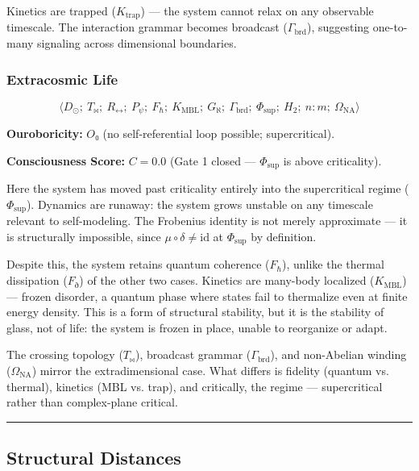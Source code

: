 \documentclass[12pt,a4paper]{article}
\begin{document}
Kinetics are trapped ($K_{\text{trap}}$) --- the system cannot relax on any observable timescale. The interaction grammar becomes broadcast ($\Gamma_{\text{brd}}$), suggesting one-to-many signaling across dimensional boundaries.

\subsubsection{Extracosmic Life}

\[\langle D_{\odot};\ T_{\bowtie};\ R_{\leftrightarrow};\ P_{\psi};\ F_{\hbar};\ K_{\text{MBL}};\ G_{\aleph};\ \Gamma_{\text{brd}};\ \Phi_{\text{sup}};\ H_2;\ n{:}m;\ \Omega_{\text{NA}} \rangle\]

\textbf{Ouroboricity:} $O₀$ (no self-referential loop possible; supercritical).

\textbf{Consciousness Score:} $C = 0.0$ (Gate 1 closed --- $\Phi_{\text{sup}}$ is above criticality).

Here the system has moved past criticality entirely into the supercritical regime ($\Phi_{\text{sup}}$). Dynamics are runaway: the system grows unstable on any timescale relevant to self-modeling. The Frobenius identity is not merely approximate --- it is structurally impossible, since $\mu \circ \delta \neq \text{id}$ at $\Phi_{\text{sup}}$ by definition.

Despite this, the system retains quantum coherence ($F_{\hbar}$), unlike the thermal dissipation ($F_{\eth}$) of the other two cases. Kinetics are many-body localized ($K_{\text{MBL}}$) --- frozen disorder, a quantum phase where states fail to thermalize even at finite energy density. This is a form of structural stability, but it is the stability of glass, not of life: the system is frozen in place, unable to reorganize or adapt.

The crossing topology ($T_{\bowtie}$), broadcast grammar ($\Gamma_{\text{brd}}$), and non-Abelian winding ($\Omega_{\text{NA}}$) mirror the extradimensional case. What differs is fidelity (quantum vs. thermal), kinetics (MBL vs. trap), and critically, the regime --- supercritical rather than complex-plane critical.

\begin{center}
\rule{0.5\textwidth}{0.4pt}
\end{center}

\subsection{Structural Distances}
\end{document}
